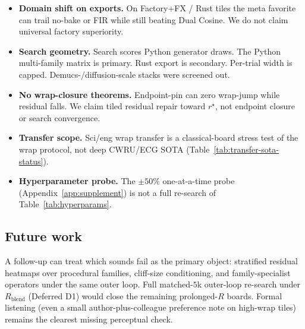 \begin{itemize}
    Latency timings in Appendix~\ref{app:supplement} still use the wavetable checkpoint zero-shot.
    Cycle-GAN / BeatDiff / real KIT--PMU / MOS remain incomplete where noted
    (Table~\ref{tab:transfer-sota-status}).
  \item \textbf{Domain shift on exports.}
    On Factory+FX / Rust tiles the meta favorite can trail no-bake or FIR while still beating Dual Cosine.
    We do not claim universal factory superiority.
  \item \textbf{Search geometry.}
    Search scores Python generator draws.
    The Python multi-family matrix is primary. Rust export is secondary.
    Per-trial width is capped. Demucs-/diffusion-scale stacks were screened out.
  \item \textbf{No wrap-closure theorems.}
    Endpoint-pin can zero wrap-jump while residual falls.
    We claim tiled residual repair toward $r^{\star}$, not endpoint closure or search convergence.
  \item \textbf{Transfer scope.}
    Sci/eng wrap transfer is a classical-board stress test of the wrap protocol, not deep CWRU/ECG SOTA
    (Table~\ref{tab:transfer-sota-status}).
  \item \textbf{Hyperparameter probe.}
    The $\pm 50\%$ one-at-a-time probe (Appendix~\ref{app:supplement}) is not a full re-search of Table~\ref{tab:hyperparams}.
\end{itemize}

\subsection{Future work}
\label{sec:outlook}

A follow-up can treat which sounds fail as the primary object: stratified residual heatmaps over procedural families, cliff-size conditioning, and family-specialist operators under the same outer loop.
Full matched-$5$k outer-loop re-search under $R_{\mathrm{blend}}$ (Deferred D1) would close the remaining prolonged-$R$ boards.
Formal listening (even a small author-plus-colleague preference note on high-wrap tiles) remains the clearest missing perceptual check.
